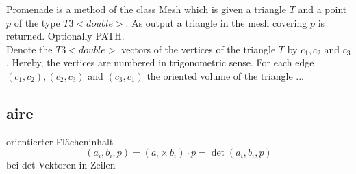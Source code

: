 \documentclass[10pt]{article}
\begin{document}
Promenade is a method of the class Mesh which is given a triangle $T$ and a point $p$ of the type $T3<double>$. As output a triangle in the mesh covering $p$ is returned. Optionally PATH.\\
Denote the $T3<double>$ vectors of the vertices of the triangle $T$ by $c_1,c_2$ and $c_3$. Hereby, the vertices are numbered in trigonometric sense. For each edge $(c_1,c_2), (c_2,c_3)$ and $(c_3,c_1)$ the oriented volume of the triangle ...

\subsection{aire}

orientierter Flächeninhalt
$$ (a_i,b_i,p) = (a_i \times b_i ) \cdot p = \det(a_i,b_i,p) $$
bei det Vektoren in Zeilen


\begin{figure}[h]
\end{figure}
\end{document}
